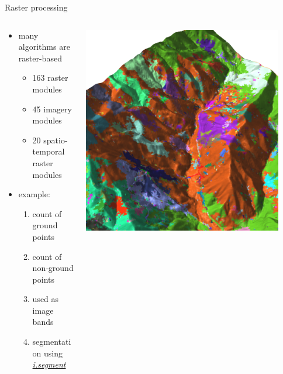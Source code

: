 \documentclass[xcolor={dvipsnames,usenames},beamer,aspectratio=169]{beamer}
\newcommand{\gmodule}[1]{\href{http://grass.osgeo.org/grass71/manuals/#1.html}{\emph{#1}}}
\begin{document}
\begin{frame}{Raster processing}




\begin{columns}
\begin{column}{0.5\textwidth}

\begin{itemize}
  \item many algorithms are raster-based
  \begin{itemize}
    \item 163 raster modules
    \item 45 imagery modules
    \item 20 spatio-temporal raster modules
  \end{itemize}
  \item example:
  \begin{enumerate}
    \item count of ground points
    \item count of non-ground points
    \item used as image bands
    \item segmentation using \gmodule{i.segment}
  \end{enumerate}
\end{itemize}

\end{column}
\begin{column}{0.45\textwidth}

\begin{center}
  \includegraphics[width=0.9\textwidth]{grass/segment_on_counts}
\end{center}


\end{column}
\end{columns}
\end{frame}
\end{document}
